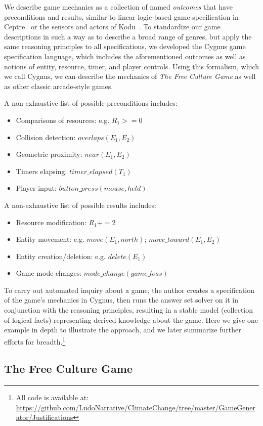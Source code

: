 \documentclass[12pt]{report}
\begin{document}
We describe game mechanics as a collection of named {\em outcomes} that
have preconditions and results, similar to linear logic-based game
specification in Ceptre~\cite{martens2015ceptre} or the sensors and actors
of Kodu~\cite{stolee2011expressing}. To standardize our game descriptions
in such a way as to describe a broad range of genres, but apply the same
reasoning principles to all specifications, we developed the Cygnus game specification language, which includes the 
aforementioned outcomes as well as notions of
entity, resource, timer, and player controls. Using this formalism, which
we call Cygnus, we can describe the mechanics of {\em The Free Culture
Game} as well as other classic arcade-style games.

A non-exhaustive list of possible preconditions includes:
\begin{itemize}
\item Comparisons of resources: e.g. $R_1 >= 0$
\item Collision detection:  $overlaps(E_1, E_2)$
\item Geometric proximity: $near(E_1, E_2)$
\item Timers elapsing:    $timer\_elapsed(T_1)$
\item Player input:     $button\_press(mouse,held)$
\end{itemize}

A non-exhaustive list of possible results includes:
\begin{itemize}
\item Resource modification:  $R_1 += 2$
\item Entity movement:  e.g. $move(E_1,north)$; $move\_toward(E_1, E_2)$
\item Entity creation/deletion:  e.g. $delete(E_1)$
\item Game mode changes:  $mode\_change(game\_loss)$
\end{itemize}

To carry out automated inquiry about a game, the author creates a
specification of the game's mechanics in Cygnus, then runs the answer set
solver on it in conjunction with the reasoning principles, resulting in a
stable model (collection of logical facts) representing derived knowledge
about the game.  Here we give one example in depth to illustrate the
approach, and we later summarize further efforts for breadth.\footnote{All
code is available at:
\url{https://github.com/LudoNarrative/ClimateChange/tree/master/GameGenerator/Justifications}}

\subsection*{The Free Culture Game}
\end{document}
